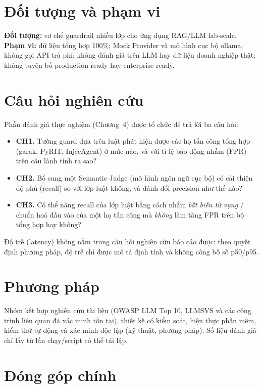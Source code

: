 \section*{Đối tượng và phạm vi}

\textbf{Đối tượng:} cơ chế guardrail nhiều lớp cho ứng dụng RAG/LLM lab-scale. \textbf{Phạm vi:} dữ liệu tổng hợp 100\%; Mock Provider và mô hình cục bộ ollama; không gọi API trả phí; không đánh giá trên LLM hay dữ liệu doanh nghiệp thật; không tuyên bố production-ready hay enterprise-ready.

\section*{Câu hỏi nghiên cứu}

Phần đánh giá thực nghiệm (Chương~4) được tổ chức để trả lời ba câu hỏi:

\begin{itemize}
    \item \textbf{CH1.} Tường guard dựa trên luật phát hiện được các họ tấn công
    tổng hợp (garak, PyRIT, InjecAgent) ở mức nào, và với tỉ lệ báo động nhầm
    (FPR) trên câu lành tính ra sao?
    \item \textbf{CH2.} Bổ sung một Semantic Judge (mô hình ngôn ngữ cục bộ) có
    cải thiện độ phủ (recall) so với lớp luật không, và đánh đổi precision như
    thế nào?
    \item \textbf{CH3.} Có thể nâng recall của lớp luật bằng cách nhắm
    \emph{bất biến từ vựng} / chuẩn hoá đầu vào của một họ tấn công mà
    \emph{không} làm tăng FPR trên bộ tổng hợp hay không?
\end{itemize}

Độ trễ (latency) không nằm trong câu hỏi nghiên cứu báo cáo được: theo quyết
định phương pháp, độ trễ chỉ được mô tả định tính và không công bố số p50/p95.

\section*{Phương pháp}

Nhóm kết hợp nghiên cứu tài liệu (OWASP LLM Top 10, LLMSVS và các công trình liên quan đã xác minh tồn tại), thiết kế có kiểm soát, hiện thực phần mềm, kiểm thử tự động và xác minh độc lập (kỹ thuật, phương pháp). Số liệu đánh giá chỉ lấy từ lần chạy/script có thể tái lập.

\section*{Đóng góp chính}

